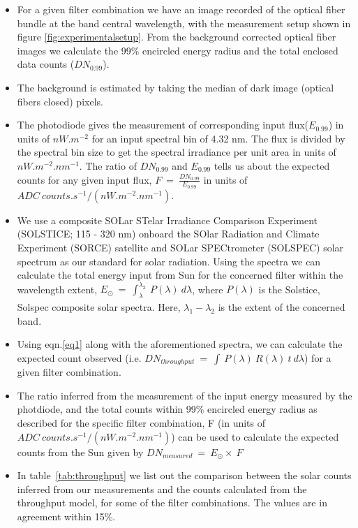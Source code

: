 \documentclass[12pt]{spieman}  %
\begin{document}
 \begin{itemize}
     \item For a given filter combination we have an image recorded of the optical fiber bundle at the band central wavelength, with the measurement setup shown in figure \ref{fig:experimentalsetup}. From the background corrected optical fiber images we calculate the 99\% encircled energy radius and the total enclosed data counts ($DN_{0.99}$).
     \item The background is estimated by taking the median of dark image (optical fibers closed) pixels.
     \item The photodiode gives the measurement of corresponding input flux($E_{0.99}$) in units of $nW.m^{-2}$ for an input spectral bin of 4.32 nm. The flux is divided by the spectral bin size to get the spectral irradiance per unit area in units of $nW.m^{-2}.nm^{-1}$. The ratio of $DN_{0.99}$ and ${E_{0.99}}$ tells us about the expected counts for any given input flux, $F~=~\frac{DN_{0.99}}{E_{0.99}}$ in units of $ADC~counts.s^{-1}/(nW.m^{-2}.nm^{-1})$.
     \item We use a composite SOLar STelar Irradiance Comparison Experiment (SOLSTICE; 115 - 320 nm) onboard the SOlar Radiation and Climate Experiment (SORCE) \cite{rottman05,harder05,mcclintock05} satellite and SOLar SPECtrometer (SOLSPEC) \cite{thuillier09} solar spectrum as our standard for solar radiation. Using the spectra we can calculate the total energy input from Sun for the concerned filter within the wavelength extent, $E_{\odot}~=~\int_{\lambda_{}}^{\lambda_{2}}~P(\lambda)~d\lambda$, where $P(\lambda)$ is the Solstice, Solspec composite solar spectra. Here, $\lambda_{1}-\lambda_{2}$ is the extent of the concerned band.
     \item Using eqn.\ref{eq1} along with the aforementioned spectra, we can calculate the expected count observed (i.e. $DN_{throughput}~=~\int~P(\lambda)~R(\lambda)~t~d\lambda$) for a given filter combination.
     \item The ratio inferred from the measurement of the input energy measured by the photdiode, and the total counts within 99\% encircled energy radius as described for the specific filter combination, F (in units of $ADC~counts.s^{-1}/(nW.m^{-2}.nm^{-1})$) can be used to calculate the expected counts from the Sun given by $DN_{measured}~=~E_{\odot}\times~F$
     \item In table~\ref{tab:throughput} we list out the comparison between the solar counts inferred from our measurements and the counts calculated from the throughput model, for some of the filter combinations. The values are in agreement within 15\%.
 \end{itemize}
\end{document}
